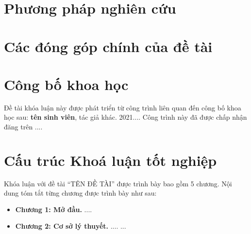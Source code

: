 \section{Phương pháp nghiên cứu}
\label{sec:PhuongPhap}

\section{Các đóng góp chính của đề tài}
\label{sec:DongGop}


\section{Công bố khoa học}
Đề tài khóa luận này được phát triển từ công trình liên quan đến công bố khoa học sau: \textbf{tên sinh viên}, tác giả khác. 2021.... Công trình này đã được chấp nhận đăng trên ....

\section{Cấu trúc Khoá luận tốt nghiệp}
\label{sec:CauTruc}
Khóa luận với đề tài ``TÊN ĐỀ TÀI'' được trình bày bao gồm 5 chương. Nội dung tóm tắt từng chương được trình bày như sau:
\begin{itemize}
    \item \textbf{Chương 1: Mở đầu.} ....
    \item \textbf{Chương 2: Cơ sở lý thuyết.} ....
...
\end{itemize}